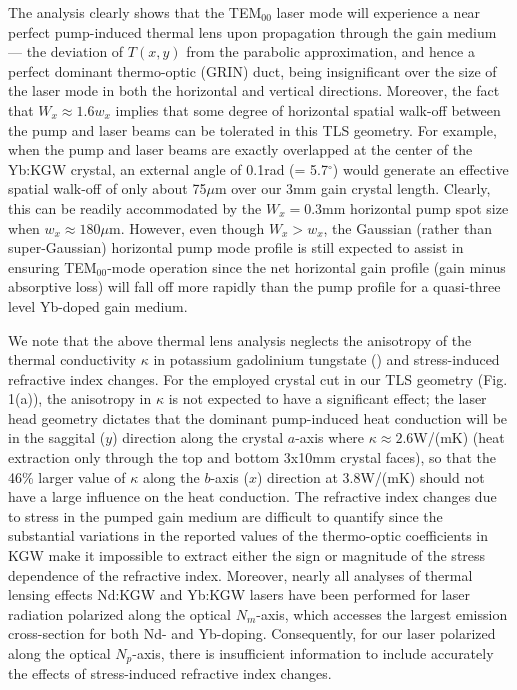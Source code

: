 
The analysis clearly shows that the TEM$_{00}$ laser mode will experience a near perfect pump-induced thermal lens upon propagation through the gain medium --- the deviation of $T(x,y)$ from the parabolic approximation, and hence a perfect dominant thermo-optic (GRIN) duct, being insignificant over the size of the laser mode in both the horizontal and vertical directions.
Moreover, the fact that $W_x \approx 1.6 w_x$ implies that some degree of horizontal spatial walk-off between the pump and laser beams can be tolerated in this TLS geometry.
For example, when the pump and laser beams are exactly overlapped at the center of the Yb:KGW crystal, an external angle of 0.1rad (= 5.7$^\circ$) would generate an effective spatial walk-off of only about 75$\mu$m over our 3mm gain crystal length.
Clearly, this can be readily accommodated by the $W_x = 0.3$mm horizontal pump spot size when $w_x \approx 180\mu$m.
However, even though $W_x > w_x$, the Gaussian (rather than super-Gaussian) horizontal pump mode profile is still expected to assist in ensuring TEM$_{00}$-mode operation since the net horizontal gain profile (gain minus absorptive loss) will fall off more rapidly than the pump profile for a quasi-three level Yb-doped gain medium\cite{Brenier_new_criteria}.

We note that the above thermal lens analysis neglects the anisotropy of the thermal conductivity $\kappa$ in potassium gadolinium tungstate () \cite{Biswal_thermo_optical_05,mochalov_laser_1997} and stress-induced refractive index changes\cite{Yumashev_laser_2007}.
For the employed crystal cut in our TLS geometry (Fig. 1(a)), the anisotropy in $\kappa$ \cite{mochalov_laser_1997,website_EKSPLA} is not expected to have a significant effect; the laser head geometry dictates that the dominant pump-induced heat conduction will be in the saggital ($y$) direction along the crystal $a$-axis where $\kappa \approx 2.6$W/(mK) (heat extraction only through the top and bottom 3x10mm crystal faces), so that the 46\% larger value of $\kappa$ along the $b$-axis ($x$) direction at 3.8W/(mK) should not have a large influence on the heat conduction.
The refractive index
changes due to stress in the pumped gain medium are difficult to quantify since the substantial variations in the reported values of the thermo-optic coefficients in KGW make it impossible to extract either the sign or magnitude of the stress dependence of the refractive index\cite{website_time_bandwidth}.
Moreover, nearly all analyses of thermal lensing effects Nd:KGW and Yb:KGW lasers have been performed for laser radiation polarized along the optical $N_m$-axis, which accesses the largest emission cross-section for both Nd- and Yb-doping\cite{Yumashev_laser_2007,Hellstrom_efficient_2006}.
Consequently, for our laser polarized along the optical $N_p$-axis\cite{Holtom_mode_locked_2006}, there is insufficient information to include accurately the effects of stress-induced refractive index changes.

